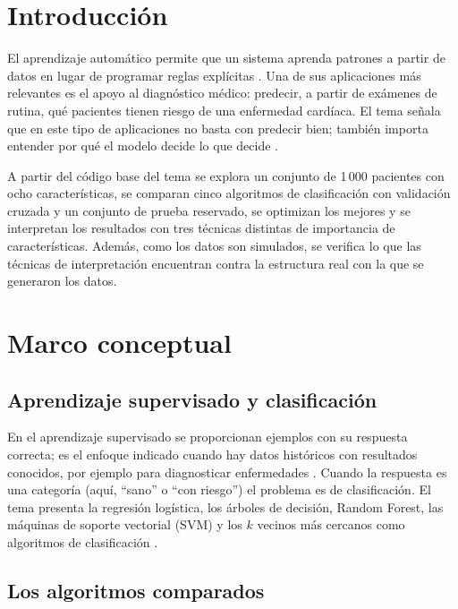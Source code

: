 \documentclass[11pt,letterpaper]{article}
\begin{document}
\portada
\indicegeneral

\section{Introducción}

El aprendizaje automático permite que un sistema aprenda patrones a partir de datos en lugar de programar reglas explícitas \parencite{iae_u4_t43, geron2022}. Una de sus aplicaciones más relevantes es el apoyo al diagnóstico médico: predecir, a partir de exámenes de rutina, qué pacientes tienen riesgo de una enfermedad cardíaca. El tema señala que en este tipo de aplicaciones no basta con predecir bien; también importa entender por qué el modelo decide lo que decide \parencite{iae_u4_t43}.

A partir del código base del tema se explora un conjunto de 1\,000 pacientes con ocho características, se comparan cinco algoritmos de clasificación con validación cruzada y un conjunto de prueba reservado, se optimizan los mejores y se interpretan los resultados con tres técnicas distintas de importancia de características. Además, como los datos son simulados, se verifica lo que las técnicas de interpretación encuentran contra la estructura real con la que se generaron los datos.

\section{Marco conceptual}

\subsection{Aprendizaje supervisado y clasificación}

En el aprendizaje supervisado se proporcionan ejemplos con su respuesta correcta; es el enfoque indicado cuando hay datos históricos con resultados conocidos, por ejemplo para diagnosticar enfermedades \parencite{iae_u4_t43}. Cuando la respuesta es una categoría (aquí, ``sano'' o ``con riesgo'') el problema es de clasificación. El tema presenta la regresión logística, los árboles de decisión, Random Forest, las máquinas de soporte vectorial (SVM) y los $k$ vecinos más cercanos como algoritmos de clasificación \parencite{iae_u4_t43}.

\subsection{Los algoritmos comparados}
\end{document}
